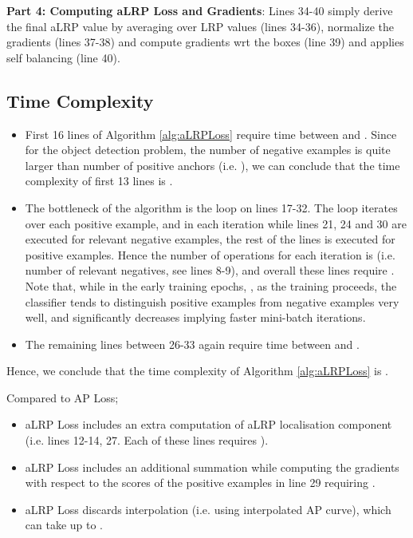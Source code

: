 \documentclass{article}
\begin{document}
\textbf{Part 4: Computing aLRP Loss and Gradients}: Lines 34-40 simply derive the final aLRP value by averaging over LRP values (lines 34-36), normalize the gradients (lines 37-38) and compute gradients wrt the boxes (line 39) and applies self balancing (line 40).

\subsection{Time Complexity} 
\begin{itemize}
    \item First 16 lines of Algorithm \ref{alg:aLRPLoss} require time between  and . Since for the object detection problem, the number of negative examples is quite larger than number of positive anchors (i.e. ), we can conclude that the time complexity of first 13 lines is .
    \item  The bottleneck of the algorithm is the loop on lines 17-32. The loop iterates over each positive example, and in each iteration while lines 21, 24 and 30 are executed for relevant negative examples, the rest of the lines is executed for positive examples. Hence the number of operations for each iteration is  (i.e. number of relevant negatives, see lines 8-9), and overall these lines require .  Note that, while in the early training epochs, , as the training proceeds, the classifier tends to distinguish positive examples from negative examples very well, and  significantly decreases implying faster mini-batch iterations. 
    \item The remaining lines between 26-33 again require time between  and .
\end{itemize}
 Hence, we conclude that the time complexity of Algorithm \ref{alg:aLRPLoss} is .

Compared to AP Loss; 
\begin{itemize}
    \item aLRP Loss includes an extra computation of aLRP localisation component (i.e. lines 12-14, 27. Each of these lines requires ).
    \item aLRP Loss includes an additional summation while computing the gradients with respect to the scores of the positive examples in line 29 requiring .
    \item aLRP Loss discards interpolation (i.e. using interpolated AP curve), which can take up to .
\end{itemize}
\end{document}
